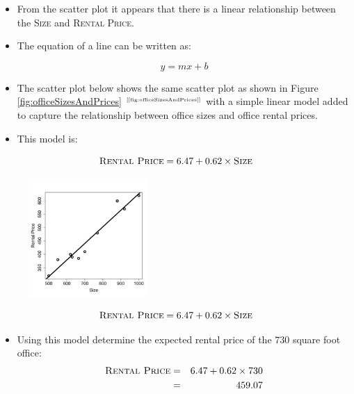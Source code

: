\documentclass[xcolor={table}]{beamer}
\newcommand{\featN}[1]{\textsc{#1}}
\newcommand{\ourRef}[1]{\ref{#1} $^{\text{\tiny[\pageref{#1}]}}$}
\begin{document}
 \begin{frame} 
 \begin{itemize}
 	\item From the scatter plot it appears that there is a linear relationship between the \featN{Size} and \featN{Rental Price}.
	\item The equation of a line can be written as:	
		\begin{center}
		\begin{equation}
			y = mx + b 
		\end{equation}\label{eqn:line}
		\end{center}
\end{itemize}
\end{frame}

\begin{frame}
	\begin{itemize}
		\item The scatter plot below shows the same scatter plot as shown in Figure \ourRef{fig:officeSizesAndPrices} with a simple linear model added to capture the relationship between office sizes and office rental prices. 
		\item This model is:
	\end{itemize}
\begin{equation*}
\featN{Rental~Price} = 6.47 + 0.62 \times \featN{Size}
\end{equation*}
\begin{figure}[htb]
\begin{center}
\includegraphics[width=0.4\textwidth]{./images/linearRegressionDemoFinalModel.pdf}
\label{fig:officeSizesAndPricesWithModel}
\end{center}
\end{figure}
\end{frame} 


 \begin{frame} 
\begin{equation*}
\featN{Rental~Price} = 6.47 + 0.62 \times \featN{Size}
\end{equation*}
\begin{itemize}
	\item Using this model determine the expected rental price of the $730$ square foot office:
\pause
 \begin{eqnarray*}
\featN{Rental~Price} & = & 6.47 + 0.62 \times 730 \\
& = & 459.07
\end{eqnarray*}
\end{itemize}
\end{frame} 
\end{document}
